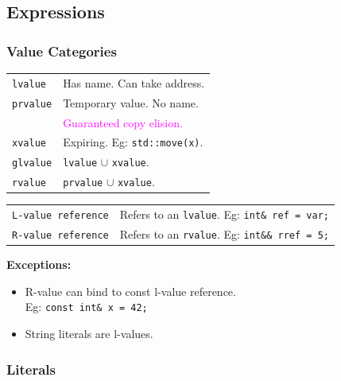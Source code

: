\subsection{Expressions}

\subsubsection{Value Categories}

\begin{tabularx}{\linewidth}{lX}
    \texttt{lvalue}     & Has name. Can take address.\\
    \texttt{prvalue}    & Temporary value. No name. \\
                        & \textcolor{magenta}{Guaranteed copy elision.} \\
    \texttt{xvalue}     & Expiring. Eg: \texttt{std::move(x)}.\\
    \texttt{glvalue}    & \texttt{lvalue} $\cup$ \texttt{xvalue}.\\
    \texttt{rvalue}     & \texttt{prvalue} $\cup$ \texttt{xvalue}.\\
\end{tabularx}

\begin{tabularx}{\linewidth}{lX}
    \texttt{L-value reference} & Refers to an \texttt{lvalue}. Eg: \texttt{int\& ref = var;}\\
    \texttt{R-value reference} & Refers to an \texttt{rvalue}. Eg: \texttt{int\&\& rref = 5;}\\
\end{tabularx}

\begin{mdframed}[backgroundcolor=gray!10,linecolor=Firebrick4]
\textbf{Exceptions:}\\
\vspace{-1.5em}
\begin{itemize}
\setlength\itemsep{-0.25em}
    \item R-value can bind to const l-value reference.\\
            Eg: \texttt{const int\& x = 42;}
    \item String literals are l-values.
\end{itemize}
\end{mdframed}

\subsubsection{Literals}

